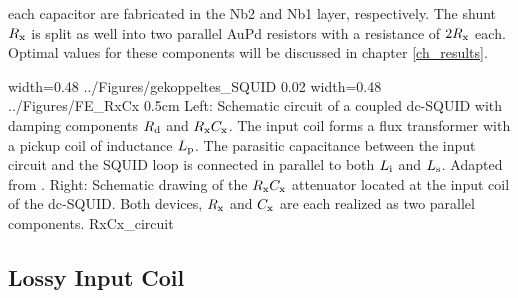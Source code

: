 each capacitor are fabricated in the Nb2 and Nb1 layer, respectively. The shunt $R_{\rm x}$ is split as well into two parallel AuPd resistors with a resistance of $2R_{\rm x}$ each. Optimal values for these components will be discussed in chapter \ref{ch_results}.

{width=0.48\textwidth}
{../Figures/gekoppeltes_SQUID}
{0.02\textwidth} %
{width=0.48\textwidth}
{../Figures/FE_RxCx}
{0.5cm} %
{Left: Schematic circuit of a coupled dc-SQUID with damping components $R_{\rm d}$ and $R_{\rm x}C_{\rm x}$. The input coil forms a flux transformer with a pickup coil of inductance $L_{\rm p}$. The parasitic capacitance between the input circuit and the SQUID loop is connected in parallel to both $L_{\rm i}$ and $L_{\rm s}$. Adapted from \cite{Bauer2022}. Right: Schematic drawing of the $R_{\rm x}C_{\rm x}$ attenuator located at the input coil of the dc-SQUID. Both devices, $R_{\rm x}$ and $C_{\rm x}$ are each realized as two parallel components.}
{RxCx_circuit}

\subsection{Lossy Input Coil}\label{subsec_L_FE}

